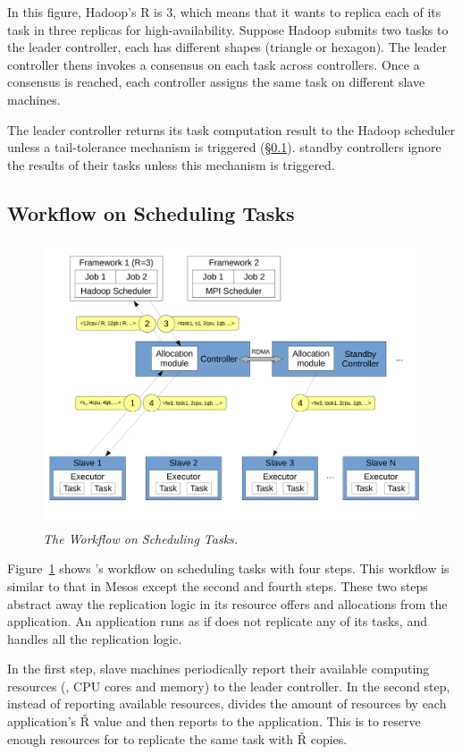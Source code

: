 In this figure, Hadoop's R is 3, which means that it wants to replica each of 
its task in three replicas for high-availability. Suppose Hadoop submits two 
tasks to the leader controller, each has different shapes (triangle or 
hexagon). The leader controller thens invokes a consensus on each task across 
controllers. Once a consensus is reached, each controller assigns the same task 
on different slave machines.

The leader controller returns its task computation result to the Hadoop 
scheduler unless a tail-tolerance mechanism is triggered 
(\S\ref{sec:workflow}). standby controllers ignore the results of their tasks 
unless this mechanism is triggered.



\subsection{Workflow on Scheduling Tasks} \label{sec:workflow}

\begin{figure}[t]
\vspace{.20in}
\centering
\includegraphics[width=.47\textwidth]{figures/flow}
\vspace{.06in}
\caption{{\em The \xxx Workflow on Scheduling Tasks.}} \label{fig:workflow}
\vspace{-.05in}
\end{figure}

Figure~\ref{fig:workflow} shows \xxx's workflow on scheduling tasks with four 
steps. This workflow is similar to that in Mesos except the second and fourth 
steps. These two steps \xxx abstract away the replication logic in its resource 
offers and allocations from the application. An application runs as if \xxx does 
not replicate any of its tasks, and \xxx handles all the replication logic.

In the first step, slave machines periodically report their available computing 
resources (\eg, CPU cores and memory) to the leader controller. In the second 
step, instead of reporting available resources, \xxx divides the amount of 
resources by each application's \v{R} value and then reports to the 
application. This is to reserve enough resources for \xxx to replicate the same 
task with \v{R} copies.

